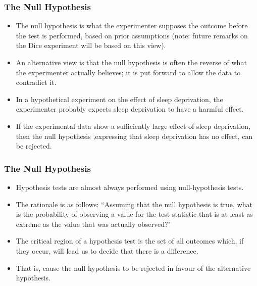 \begin{frame}
\frametitle{The Null Hypothesis }
\large
\begin{itemize}
\item The null hypothesis is what the experimenter supposes the outcome before the test is performed, based on prior assumptions (note:  future remarks on the Dice experiment will be based on this view).
\item An alternative view is that the null hypothesis is often the reverse of what the experimenter actually believes; it is put forward to allow the data to contradict it. \item In a hypothetical experiment on the effect of sleep deprivation, the experimenter probably expects sleep deprivation to have a harmful effect. \item If the experimental data show a sufficiently large effect of sleep deprivation, then the null hypothesis ,expressing that sleep deprivation has no effect, can be rejected.
\end{itemize}
\end{frame}


\begin{frame}
\frametitle{The Null Hypothesis }
\large
\begin{itemize}
\item Hypothesis tests are almost always performed using null-hypothesis tests.

    \item The rationale is as follows: ``Assuming that the null hypothesis is true, what is the probability of observing a value for the test statistic that is at least as extreme as the value that was actually observed?"
\item
The critical region of a hypothesis test is the set of all outcomes which, if they occur, will lead us to decide that there is a difference.
\item That is, cause the null hypothesis to be rejected in favour of the alternative hypothesis.
\end{itemize}
\end{frame}


